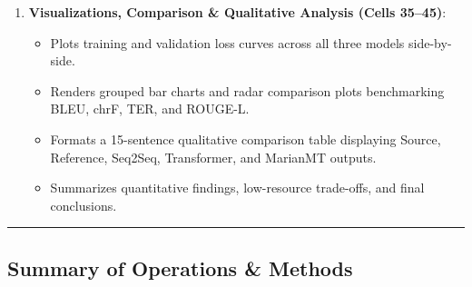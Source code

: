 \documentclass[12pt,a4paper,oneside]{report}
\providecommand{\tightlist}{\setlength{\itemsep}{0pt}\setlength{\parskip}{0pt}}
\begin{document}
\begin{enumerate}
  \begin{itemize}
  \tightlist
  \item
    Implements greedy and autoregressive decoding functions for all three models.
  \item
    Computes automated metrics across test hypotheses: \textbf{BLEU} (sacrebleu n-gram precision with brevity penalty), \textbf{chrF} (character n-gram F-score), \textbf{TER} (minimum edit rate), and \textbf{ROUGE-L} (longest common subsequence).
  \end{itemize}
\item
  \textbf{Visualizations, Comparison \& Qualitative Analysis (Cells 35--45)}:

  \begin{itemize}
  \tightlist
  \item
    Plots training and validation loss curves across all three models side-by-side.
  \item
    Renders grouped bar charts and radar comparison plots benchmarking BLEU, chrF, TER, and ROUGE-L.
  \item
    Formats a 15-sentence qualitative comparison table displaying Source, Reference, Seq2Seq, Transformer, and MarianMT outputs.
  \item
    Summarizes quantitative findings, low-resource trade-offs, and final conclusions.
  \end{itemize}
\end{enumerate}

\begin{center}\rule{0.5\linewidth}{0.5pt}\end{center}

\hypertarget{summary-of-operations-methods}{%
\subsection{Summary of Operations \& Methods}\label{summary-of-operations-methods}}
\end{document}

